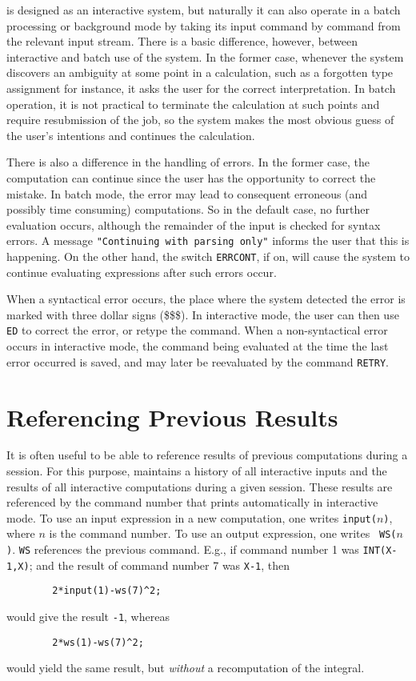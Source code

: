 {\REDUCE} is designed as an interactive system, but naturally it can also
operate in a batch processing or background mode by taking its input
command by command from the relevant input stream. There is a basic
difference, however, between interactive and batch use of the system. In
the former case, whenever the system discovers an ambiguity at some point
in a calculation, such as a forgotten type assignment for instance, it asks
the user for the correct interpretation. In batch operation, it is not
practical to terminate the calculation at such points and require
resubmission of the job, so the system makes the most obvious guess of the
user's intentions and continues the calculation.

There is also a difference in the handling of errors.  In the former case,
the computation can continue since the user has the opportunity to correct
the mistake.  In batch mode, the error may lead to consequent erroneous
(and possibly time consuming) computations.  So in the default case, no
further evaluation occurs, although the remainder of the input is checked
for syntax errors.  A message {\tt "Continuing with parsing only"}
informs the user that this is happening.  On the other hand, the switch
{\tt ERRCONT}, if on, will cause the system to continue
evaluating expressions after such errors occur.

When a syntactical error occurs, the place where the system detected the
error is marked with three dollar signs (\$\$\$). In interactive mode, the
user can then use {\tt ED} to correct the error, or retype the
command.  When a non-syntactical error occurs in interactive mode, the
command being evaluated at the time the last error occurred is saved, and
may later be reevaluated by the command {\tt RETRY}.

\section{Referencing Previous Results}

It is often useful to be able to reference results of previous
computations during a {\REDUCE} session.  For this purpose, {\REDUCE}
maintains a history of all interactive inputs and the
results of all interactive computations during a given session.  These
results are referenced by the command number that {\REDUCE} prints
automatically in interactive mode.  To use an input expression in a new
computation, one writes {\tt input(}$n${\tt )}, where
$n$ is the command number.  To use an output expression, one writes {\tt
WS(}$n${\tt )}. {\tt WS} references the previous command.
E.g., if command number 1 was {\tt INT(X-1,X)}; and the result of command
number 7 was {\tt X-1}, then
\begin{verbatim}
        2*input(1)-ws(7)^2;
\end{verbatim}
would give the result {\tt -1}, whereas
\begin{verbatim}
        2*ws(1)-ws(7)^2;
\end{verbatim}
would yield the same result, but {\em without\/} a recomputation of the
integral.

